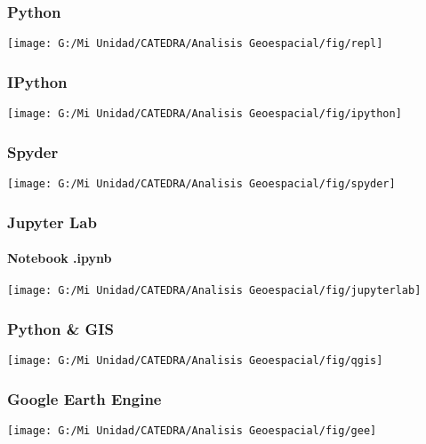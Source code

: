\documentclass[12pt]{beamer}
\begin{document}
\begin{frame}
\frametitle{Python}
\centering
	\texttt{[image: G:/Mi Unidad/CATEDRA/Analisis Geoespacial/fig/repl]}
\end{frame}
\begin{frame}
\frametitle{IPython}
\centering
	\texttt{[image: G:/Mi Unidad/CATEDRA/Analisis Geoespacial/fig/ipython]}
\end{frame}
\begin{frame}
\frametitle{Spyder}
\centering
	\texttt{[image: G:/Mi Unidad/CATEDRA/Analisis Geoespacial/fig/spyder]}
\end{frame}
\begin{frame}
\frametitle{Jupyter Lab}
\framesubtitle{Notebook .ipynb}
\centering
	\texttt{[image: G:/Mi Unidad/CATEDRA/Analisis Geoespacial/fig/jupyterlab]}
\end{frame}
\begin{frame}
\frametitle{Python \& GIS}
\centering
	\texttt{[image: G:/Mi Unidad/CATEDRA/Analisis Geoespacial/fig/qgis]}
\end{frame}
\begin{frame}
\frametitle{Google Earth Engine}
\centering
	\texttt{[image: G:/Mi Unidad/CATEDRA/Analisis Geoespacial/fig/gee]}
\end{frame}
\end{document}
